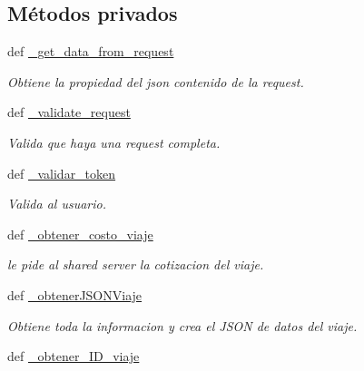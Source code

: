 \subsection*{Métodos privados}
\begin{DoxyCompactItemize}
\item 
def \hyperlink{classsrc_1_1resources_1_1agregar_posible_viaje_1_1_agregar_posible_viaje_a5e1895bbbd0a99c308c8e64ab31d849d}{\-\_\-get\-\_\-data\-\_\-from\-\_\-request}
\begin{DoxyCompactList}\small\item\em Obtiene la propiedad del json contenido de la request. \end{DoxyCompactList}\item 
def \hyperlink{classsrc_1_1resources_1_1agregar_posible_viaje_1_1_agregar_posible_viaje_a07ca4d8c5ea2ab8f8c9b15ef780b2e51}{\-\_\-validate\-\_\-request}
\begin{DoxyCompactList}\small\item\em Valida que haya una request completa. \end{DoxyCompactList}\item 
def \hyperlink{classsrc_1_1resources_1_1agregar_posible_viaje_1_1_agregar_posible_viaje_a2d8499cb043b289c3bd8ff3e8cdb2c7e}{\-\_\-validar\-\_\-token}
\begin{DoxyCompactList}\small\item\em Valida al usuario. \end{DoxyCompactList}\item 
def \hyperlink{classsrc_1_1resources_1_1agregar_posible_viaje_1_1_agregar_posible_viaje_a9fe9e1a9fe96f5c88beb0cf5dc0df429}{\-\_\-obtener\-\_\-costo\-\_\-viaje}
\begin{DoxyCompactList}\small\item\em le pide al shared server la cotizacion del viaje. \end{DoxyCompactList}\item 
def \hyperlink{classsrc_1_1resources_1_1agregar_posible_viaje_1_1_agregar_posible_viaje_af122e9531612ea88ecf6fadc18805fca}{\-\_\-obtener\-J\-S\-O\-N\-Viaje}
\begin{DoxyCompactList}\small\item\em Obtiene toda la informacion y crea el J\-S\-O\-N de datos del viaje. \end{DoxyCompactList}\item 
def \hyperlink{classsrc_1_1resources_1_1agregar_posible_viaje_1_1_agregar_posible_viaje_a3da09dd6130bae191361f3224a39c64d}{\-\_\-obtener\-\_\-\-I\-D\-\_\-viaje}

\end{DoxyCompactItemize}
